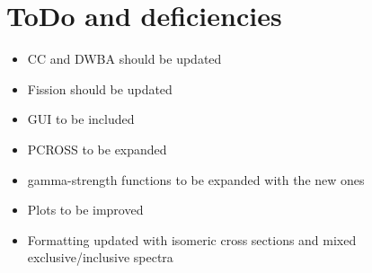 \maketitle
\tableofcontents





   \lfoot{} \rfoot{} \setlength{\headrulewidth}{0.4pt} %
\setlength{\footrulewidth}{0.4pt}

\newpage

\newpage

\section{ToDo and deficiencies}

\begin{itemize}
\item CC and DWBA should be updated

\item Fission should be updated

\item GUI to be included

\item PCROSS to be expanded

\item gamma-strength functions to be expanded with the new ones

\item Plots to be improved

\item Formatting updated with isomeric cross sections and mixed
exclusive/inclusive spectra
\end{itemize}

